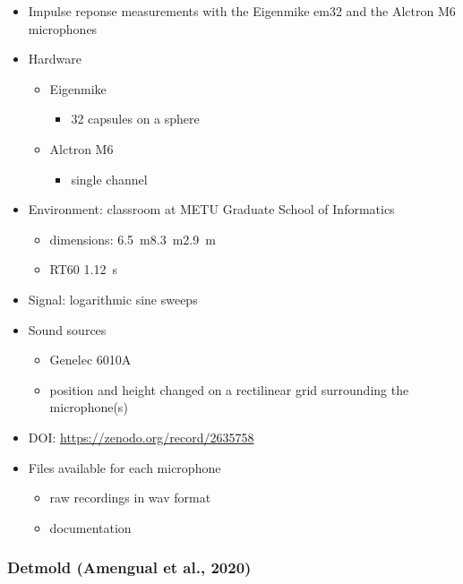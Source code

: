 \documentclass[14pt, oneside]{extarticle}
\begin{document}
\begin{itemize}

\item Impulse reponse measurements with the Eigenmike em32 and the Alctron M6 microphones \cite{olgun2019metu}

\item Hardware
	\begin{itemize}
	\item Eigenmike
		\begin{itemize}
		\item 32 capsules on a sphere
		\end{itemize}
	\item Alctron M6
		\begin{itemize}
		\item single channel	
		\end{itemize}
	\end{itemize}

\item Environment: classroom at METU Graduate School of Informatics
	\begin{itemize}
	\item dimensions: \SI{6.5}{\metre}\texttimes\SI{8.3}{\metre}\texttimes\SI{2.9}{\metre}
	\item RT60 \SI{1.12}{\second} 
	\end{itemize}

\item Signal: logarithmic sine sweeps

\item Sound sources
	\begin{itemize}
	\item Genelec 6010A
	\item position and height changed on a rectilinear grid surrounding the microphone(s)
	\end{itemize}

\item DOI: \href{10.5281/zenodo.2635758}{https://zenodo.org/record/2635758} 

\item Files available for each microphone
	\begin{itemize}
	\item raw recordings in wav format
	\item documentation
	\end{itemize}

\end{itemize}

\subsubsection{Detmold (Amengual et al., 2020)}
\end{document}
